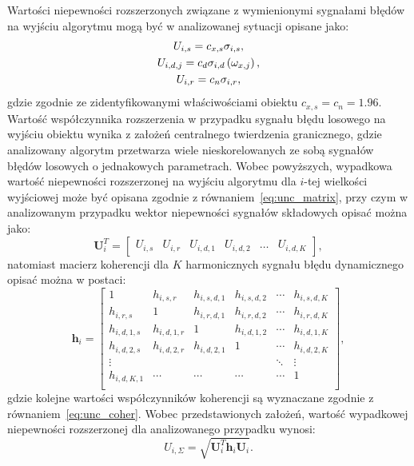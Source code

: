 Wartości niepewności rozszerzonych związane z wymienionymi sygnałami błędów na wyjściu algorytmu mogą być w analizowanej sytuacji opisane jako:
\begin{gather}
U_{i,s} = c_{x,s} \sigma_{i,s} \label{eq:pom_uncout_stat}, \\
U_{i,d,j} = c_{d} \sigma_{i,d} \left(\omega_{x,j}\right) \label{eq:pom_uncout_dyn}, \\
U_{i,r} = c_{n} \sigma_{i,r} \label{eq:pom_uncout_rand},
\end{gather}
gdzie zgodnie ze zidentyfikowanymi właściwościami obiektu $c_{x,s} = c_{n} = 1.96$. Wartość współczynnika rozszerzenia w przypadku sygnału błędu losowego na wyjściu obiektu wynika z założeń centralnego twierdzenia granicznego, gdzie analizowany algorytm przetwarza wiele nieskorelowanych ze sobą sygnałów błędów losowych o jednakowych parametrach. Wobec powyższych, wypadkowa wartość niepewności rozszerzonej na wyjściu algorytmu dla $i$-tej wielkości wyjściowej może być opisana zgodnie z równaniem~\eqref{eq:unc_matrix}, przy czym w analizowanym przypadku wektor niepewności sygnałów składowych opisać można jako:
\begin{equation}
\mathbf{U}_{i}^{T} = 
\begin{bmatrix}
U_{i,s} & U_{i,r} & U_{i,d,1} & U_{i,d,2} & \hdots & U_{i,d,K}
\end{bmatrix}
\label{eq:pom_uncout_uncvect},
\end{equation}
natomiast macierz koherencji dla $K$ harmonicznych sygnału błędu dynamicznego opisać można w postaci:
\begin{equation}
\mathbf{h}_{i} =
\begin{bmatrix}
1           & h_{i,s,r}   & h_{i,s,d,1} & h_{i,s,d,2} & \cdots & h_{i,s,d,K} \\
h_{i,r,s}   & 1           & h_{i,r,d,1} & h_{i,r,d,2} & \cdots & h_{i,r,d,K} \\
h_{i,d,1,s} & h_{i,d,1,r} & 1           & h_{i,d,1,2} & \cdots & h_{i,d,1,K} \\
h_{i,d,2,s} & h_{i,d,2,r} & h_{i,d,2,1} & 1           & \cdots & h_{i,d,2,K} \\
\vdots      &             &             &             & \ddots & \vdots      \\
h_{i,d,K,1} & \cdots      & \cdots      & \cdots      & \cdots & 1           \\
\end{bmatrix}
\label{eq:pom_uncout_cohers},
\end{equation}
gdzie kolejne wartości współczynników koherencji są wyznaczane zgodnie z równaniem~\eqref{eq:unc_coher}. Wobec przedstawionych założeń, wartość wypadkowej niepewności rozszerzonej dla analizowanego przypadku wynosi:
\begin{equation}
U_{i,\Sigma} = \sqrt{\mathbf{U}_{i}^{T} \mathbf{h}_{i} \mathbf{U}_{i}} \label{eq:pom_uncout_sum}.
\end{equation}

